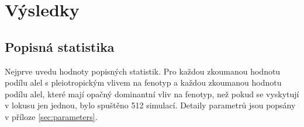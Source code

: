 \chapter{Výsledky}

%
%
%
%
%
%
%


\section{Popisná statistika}

Nejprve uvedu hodnoty popisných statistik. Pro každou zkoumanou hodnotu podílu alel s pleiotropickým vlivem na fenotyp a
každou zkoumanou hodnotu podílu alel, které mají opačný dominantní vliv na fenotyp, než pokud se vyskytují v lokusu jen
jednou, bylo spuštěno 512 simulací. Detaily parametrů jsou popsány v příloze \ref{sec:parameters}.

